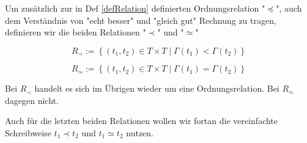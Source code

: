 \begin{Def}\label{defRelationen}

Um zusätzlich zur in Def \ref{defRelation} definierten Ordnungsrelation "$\preceq$", auch dem Verständnis von "echt besser" und "gleich gut" Rechnung zu tragen, definieren wir die beiden Relationen "$\prec$" und "$\simeq$"

\vspace{0.3cm}

\begin{equation*}
  R_{\prec}:= \left\{ (t_1, t_2) \in T \times T \mid \Gamma(t_1) < \Gamma(t_2) \right\}
\end{equation*}

\begin{equation*}
  R_{\simeq}:= \left\{ (t_1, t_2) \in T \times T \mid \Gamma(t_1) = \Gamma(t_2) \right\}
\end{equation*}

\vspace{1cm}

Bei $R_{\prec}$ handelt es sich im Übrigen wieder um eine Ordnungsrelation. Bei $R_{\simeq}$ dagegen nicht.

\end{Def}

\vspace{0.3cm}

Auch für die letzten beiden Relationen wollen wir fortan die vereinfachte Schreibweise $t_1 \prec t_2$ und $t_1 \simeq t_2$ nutzen.

\vspace{0.6cm}

